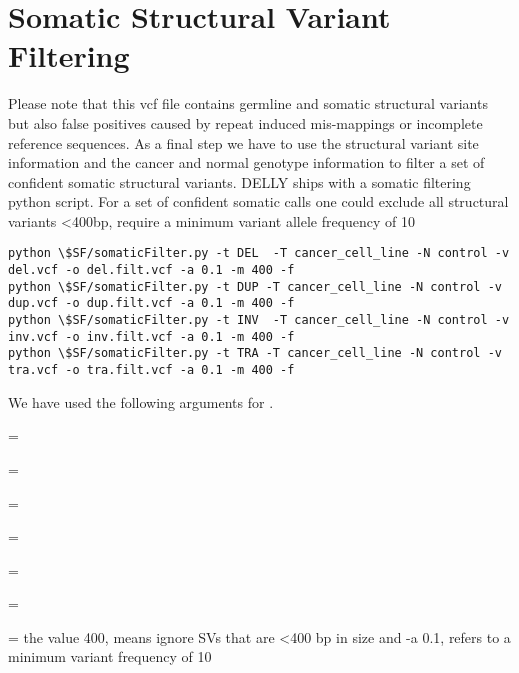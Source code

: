 \section{Somatic Structural Variant Filtering}

\begin{information}
Please note that this vcf file contains germline and somatic structural variants but also false positives caused by repeat induced mis-mappings or incomplete reference sequences. As a final step we have to use the structural variant site information and the cancer and normal genotype information to filter a set of confident somatic structural variants. DELLY ships with a somatic filtering python script. For a set of confident somatic calls one could exclude all structural variants <400bp, require a minimum variant allele frequency of 10%

\end{information}
\begin{steps}
\begin{lstlisting}
python \$SF/somaticFilter.py -t DEL  -T cancer_cell_line -N control -v del.vcf -o del.filt.vcf -a 0.1 -m 400 -f
python \$SF/somaticFilter.py -t DUP -T cancer_cell_line -N control -v dup.vcf -o dup.filt.vcf -a 0.1 -m 400 -f
python \$SF/somaticFilter.py -t INV  -T cancer_cell_line -N control -v inv.vcf -o inv.filt.vcf -a 0.1 -m 400 -f
python \$SF/somaticFilter.py -t TRA -T cancer_cell_line -N control -v tra.vcf -o tra.filt.vcf -a 0.1 -m 400 -f
\end{lstlisting}
\end{steps}

We have used the following arguments for .
\begin{description}[style=multiline,labelindent=0cm,align=right,leftmargin=\descriptionlabelspace,rightmargin=1.5cm,font=\ttfamily]
  \item[-t] = 
  \item[-T] = 
  \item[-N] = 
  \item[-v] = 
  \item[-o] = 
  \item[-a] = 
  \item[-m] = the value 400, means ignore SVs that are <400 bp in size and -a 0.1, refers to a minimum variant frequency of 10%
\end{description}


